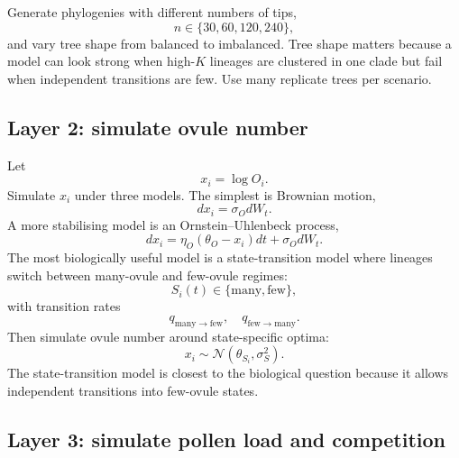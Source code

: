 \documentclass[11pt]{article}
\newcommand{\Normal}{\mathcal{N}}
\begin{document}
Generate phylogenies with different numbers of tips,
\begin{equation}
n\in\{30,60,120,240\},
\end{equation}
and vary tree shape from balanced to imbalanced. Tree shape matters because a model can look strong when high-\(K\) lineages are clustered in one clade but fail when independent transitions are few. Use many replicate trees per scenario.

\subsection{Layer 2: simulate ovule number}

Let
\begin{equation}
x_i=\log O_i.
\end{equation}
Simulate \(x_i\) under three models. The simplest is Brownian motion,
\begin{equation}
dx_i=\sigma_OdW_t.
\end{equation}
A more stabilising model is an Ornstein--Uhlenbeck process,
\begin{equation}
dx_i=\eta_O(\theta_O-x_i)dt+\sigma_OdW_t.
\end{equation}
The most biologically useful model is a state-transition model where lineages switch between many-ovule and few-ovule regimes:
\begin{equation}
S_i(t)\in\{\mathrm{many},\mathrm{few}\},
\end{equation}
with transition rates
\begin{equation}
q_{\mathrm{many}\rightarrow\mathrm{few}},\quad q_{\mathrm{few}\rightarrow\mathrm{many}}.
\end{equation}
Then simulate ovule number around state-specific optima:
\begin{equation}
x_i\sim \Normal(\theta_{S_i},\sigma_S^2).
\end{equation}
The state-transition model is closest to the biological question because it allows independent transitions into few-ovule states.

\subsection{Layer 3: simulate pollen load and competition}
\end{document}
